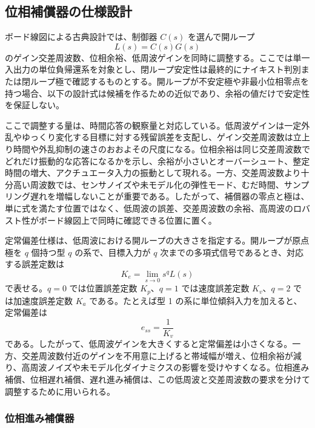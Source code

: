 \subsection{位相補償器の仕様設計}

ボード線図による古典設計では、制御器 $C(s)$ を選んで開ループ
\begin{equation}
  L(s)=C(s)G(s)
\end{equation}
のゲイン交差周波数、位相余裕、低周波ゲインを同時に調整する。ここでは単一入出力の単位負帰還系を対象とし、閉ループ安定性は最終的にナイキスト判別または閉ループ極で確認するものとする。開ループが不安定極や非最小位相零点を持つ場合、以下の設計式は候補を作るための近似であり、余裕の値だけで安定性を保証しない。

ここで調整する量は、時間応答の観察量と対応している。低周波ゲインは一定外乱やゆっくり変化する目標に対する残留誤差を支配し、ゲイン交差周波数は立上り時間や外乱抑制の速さのおおよその尺度になる。位相余裕は同じ交差周波数でどれだけ振動的な応答になるかを示し、余裕が小さいとオーバーシュート、整定時間の増大、アクチュエータ入力の振動として現れる。一方、交差周波数より十分高い周波数では、センサノイズや未モデル化の弾性モード、むだ時間、サンプリング遅れを増幅しないことが重要である。したがって、補償器の零点と極は、単に式を満たす位置ではなく、低周波の誤差、交差周波数の余裕、高周波のロバスト性がボード線図上で同時に確認できる位置に置く。

定常偏差仕様は、低周波における開ループの大きさを指定する。開ループが原点極を $q$ 個持つ型 $q$ の系で、目標入力が $q$ 次までの多項式信号であるとき、対応する誤差定数は
\begin{equation}
  K_e=\lim_{s\to0}s^q L(s)
\end{equation}
で表せる。$q=0$ では位置誤差定数 $K_p$、$q=1$ では速度誤差定数 $K_v$、$q=2$ では加速度誤差定数 $K_a$ である。たとえば型 1 の系に単位傾斜入力を加えると、定常偏差は
\begin{equation}
  e_{ss}=\frac{1}{K_v}
\end{equation}
である。したがって、低周波ゲインを大きくすると定常偏差は小さくなる。一方、交差周波数付近のゲインを不用意に上げると帯域幅が増え、位相余裕が減り、高周波ノイズや未モデル化ダイナミクスの影響を受けやすくなる。位相進み補償、位相遅れ補償、遅れ進み補償は、この低周波と交差周波数の要求を分けて調整するために用いられる。

\subsubsection{位相進み補償器}

